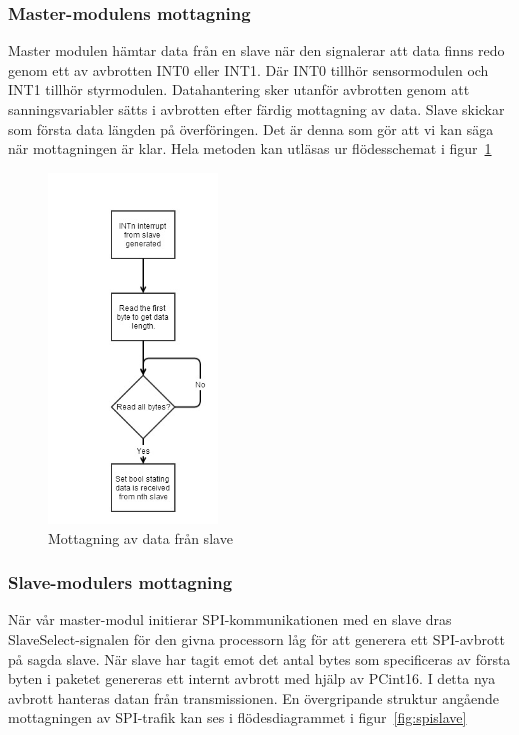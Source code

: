 \documentclass[a4paper,12pt,fleqn]{article}
\begin{document}
\subsubsection{Master-modulens mottagning}

Master modulen hämtar data från en slave när den signalerar att data finns redo genom ett av avbrotten INT0 eller INT1. Där INT0 tillhör sensormodulen och INT1 tillhör styrmodulen. Datahantering sker utanför avbrotten genom att sanningsvariabler sätts i avbrotten efter färdig mottagning av data.
Slave skickar som första data längden på överföringen. Det är denna som gör att vi kan säga när mottagningen är klar. Hela metoden kan utläsas ur flödesschemat i figur~\ref{fig:spimaster}

\begin{figure}[htp] %
  \begin{center}
  \includegraphics[keepaspectratio=true,width=0.4\textwidth]{bilder/masterinterrupt.jpg}  %
  \end{center}
  \caption{Mottagning av data från slave} %
  \label{fig:spimaster}
\end{figure}


\subsubsection{Slave-modulers mottagning}
När vår master-modul initierar SPI-kommunikationen med en slave dras SlaveSelect-signalen för den givna processorn låg för att generera ett SPI-avbrott på sagda slave. När slave har tagit emot det antal bytes som specificeras av första byten i paketet genereras ett internt avbrott med hjälp av PCint16. I detta nya avbrott hanteras datan från transmissionen. En övergripande struktur angående mottagningen av SPI-trafik kan ses i flödesdiagrammet i figur~\ref{fig:spislave}
\end{document}
